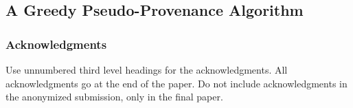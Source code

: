\documentclass[final]{article}
\begin{document}
\subsection{A Greedy Pseudo-Provenance Algorithm}

\subsubsection*{Acknowledgments}

Use unnumbered third level headings for the acknowledgments. All
acknowledgments go at the end of the paper. Do not include
acknowledgments in the anonymized submission, only in the final paper.




\end{document}
